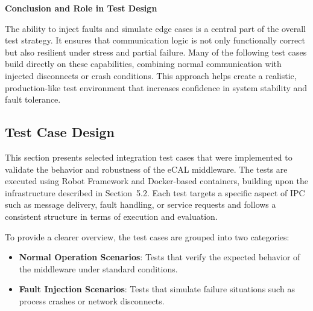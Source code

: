 \vspace{0.5em}
\textbf{Conclusion and Role in Test Design}

\vspace{0.4em}
The ability to inject faults and simulate edge cases is a central part of the overall test strategy. It ensures that communication logic is not only functionally correct but also resilient under stress and partial failure. Many of the following test cases build directly on these capabilities, combining normal communication with injected disconnects or crash conditions. This approach helps create a realistic, production-like test environment that increases confidence in system stability and fault tolerance.


\subsection{Test Case Design}

This section presents selected integration test cases that were implemented to validate the behavior and robustness of the eCAL middleware. The tests are executed using Robot Framework and Docker-based containers, building upon the infrastructure described in Section~5.2. Each test targets a specific aspect of IPC such as message delivery, fault handling, or service requests and follows a consistent structure in terms of execution and evaluation.

\vspace{1em}
To provide a clearer overview, the test cases are grouped into two categories:

\begin{itemize}
	\item \textbf{Normal Operation Scenarios}: Tests that verify the expected behavior of the middleware under standard conditions.
	\item \textbf{Fault Injection Scenarios}: Tests that simulate failure situations such as process crashes or network disconnects.
\end{itemize}

